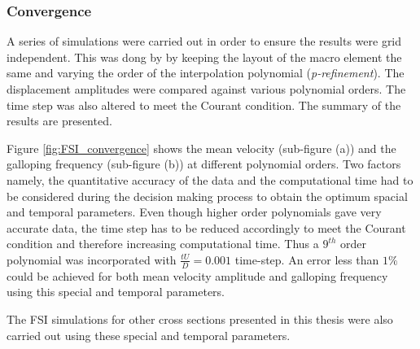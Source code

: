  
 

\subsubsection{Convergence}

A series of simulations were carried out in order to ensure the results were grid independent. This was dong by by keeping the layout of the macro element the same and varying the order of the interpolation polynomial (\emph{p-refinement}). The displacement amplitudes were compared against various polynomial orders. The time step was also altered to meet the Courant condition. The summary of the results are presented.



Figure \ref{fig:FSI_convergence} shows the mean velocity (sub-figure (a)) and the galloping frequency (sub-figure (b)) at different polynomial orders. Two factors namely, the quantitative accuracy of the data and the computational time had to be considered during the decision making process to obtain the optimum spacial and temporal parameters. Even though higher order polynomials gave very accurate data, the time step has to be reduced accordingly to meet the Courant condition and therefore increasing computational time. Thus a $9^{th}$ order polynomial was incorporated with $\frac{tU}{D}=0.001$ time-step. An error less than $1\%$ could be achieved for both mean velocity amplitude and galloping frequency using this special and temporal parameters.

The FSI simulations for other cross sections presented in this thesis were also carried out using these special and temporal parameters.     















